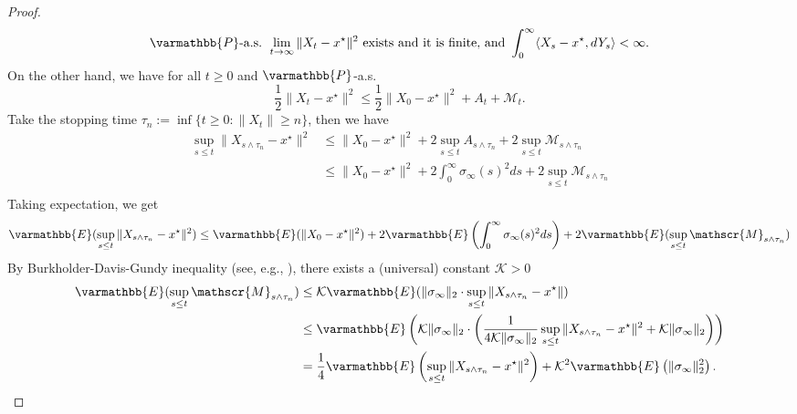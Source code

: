 \documentclass[11pt,reqno]{article}
\let\mathbb=\varmathbb
\newcommand{\1}{\mathds{1}}
\numberwithin{equation}{section}  %
\theoremstyle{plain}
\theoremstyle{definition}
\theoremstyle{remark}
\numberwithin{theorem}{section}
\numberwithin{remark}{section}
\numberwithin{example}{section}
\begin{document}
\begin{proof}
    \begin{equation*}
		\mathbb{P}\text{-a.s. }\lim_{t\to\infty} \|X_t-x^\star\|^2 \text{ exists and it is finite, and }\int_0^\infty \langle X_s-x^\star, dY_s\rangle<\infty.
    \end{equation*}
    On the other hand, we have for all $t\geq 0$ and $\mathbb{P}$-a.s.
    \begin{equation*}
        \frac{1}{2}\|X_t-x^\star\|^2 \leq \frac{1}{2}\|X_0-x^\star\|^2 + A_t + \mathscr{M}_t.
    \end{equation*}
    Take the stopping time $\tau_n := \inf\{ t\geq 0 : \|X_t\|\geq n \}$, then we have 
    \begin{equation*}
        \begin{aligned}
            \sup_{s\leq t}\|X_{s\wedge \tau_n}-x^\star\|^2 &\leq \|X_0-x^\star\|^2 + 2\sup_{s\leq t}A_{s\wedge\tau_n} + 2\sup_{s\leq t}\mathscr{M}_{s\wedge\tau_n}\\
            &\leq \|X_0-x^\star\|^2 + 2\int_0^\infty\sigma_\infty(s)^2 ds + 2\sup_{s\leq t}\mathscr{M}_{s\wedge\tau_n}\\
        \end{aligned}
    \end{equation*}
    Taking expectation, we get
    \begin{equation*}
            \mathbb{E}(\sup_{s\leq t}\|X_{s\wedge \tau_n}-x^\star\|^2) \leq \mathbb{E}(\|X_0-x^\star\|^2) + 2\mathbb{E}\left(\int_0^\infty\sigma_\infty(s)^2 ds\right) + 2\mathbb{E}(\sup_{s\leq t}\mathscr{M}_{s\wedge\tau_n})
    \end{equation*}
  By Burkholder-Davis-Gundy inequality (see, e.g., \cite[Theorem 3.28]{MR1121940}), there exists a (universal)  constant $\mathcal{K}>0$ 
    \begin{equation}\label{eqBDG}
        \begin{aligned}
            \mathbb{E}(\sup_{s\leq t}\mathscr{M}_{s\wedge\tau_n}) &\leq \mathcal{K}\mathbb{E}(\|\sigma_\infty\|_2\cdot \sup_{s\leq t}\|X_{s\wedge\tau_n}-x^\star\|)\\
            &\leq \mathbb{E}\left(\mathcal{K}\|\sigma_\infty\|_2\cdot \left(\frac{1}{4 \mathcal{K}\|\sigma_\infty\|_2}\sup_{s\leq t}\|X_{s\wedge\tau_n}-x^\star\|^2 + \mathcal{K}\|\sigma_\infty\|_2\right)\right)\\
            &=\frac{1}{4}\mathbb{E}\left(\sup_{s\leq t}\|X_{s\wedge\tau_n}-x^\star\|^2\right) + \mathcal{K}^2\mathbb{E}\left(\|\sigma_\infty\|_2^2\right).
        \end{aligned}
    \end{equation}

\end{proof}
\end{document}

